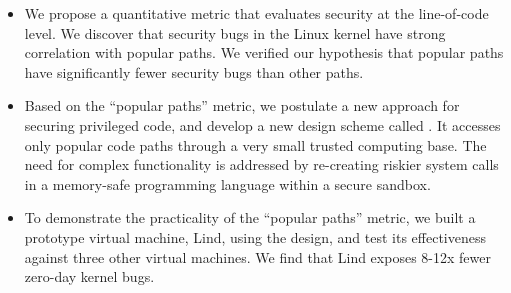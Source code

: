 \begin{itemize}\setlength\itemsep{0em}

\item
We propose a quantitative metric that evaluates security at the line-of-code level. 
We discover that security bugs in the Linux kernel have strong correlation with popular paths. 
We verified our hypothesis that popular paths have significantly fewer security bugs than other paths. 

\item
Based on the ``popular paths'' metric, we postulate a new approach for securing privileged code,
and develop a new design scheme called \lip. It
accesses only popular code paths
through a very small trusted computing base.
The need for complex functionality is addressed by re-creating riskier system calls
in a memory-safe programming language within a secure sandbox.

\item
To demonstrate the practicality of the ``popular paths'' metric, we built a prototype virtual machine, Lind, using the \lip design,
and test its effectiveness against three other virtual machines. We find that
Lind exposes 8-12x fewer zero-day kernel bugs. 
\end{itemize}

